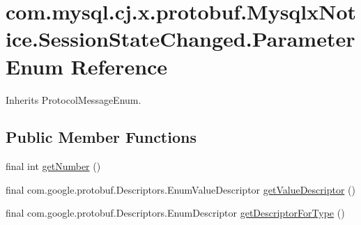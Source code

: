\hypertarget{enumcom_1_1mysql_1_1cj_1_1x_1_1protobuf_1_1_mysqlx_notice_1_1_session_state_changed_1_1_parameter}{}\section{com.\+mysql.\+cj.\+x.\+protobuf.\+Mysqlx\+Notice.\+Session\+State\+Changed.\+Parameter Enum Reference}
\label{enumcom_1_1mysql_1_1cj_1_1x_1_1protobuf_1_1_mysqlx_notice_1_1_session_state_changed_1_1_parameter}


Inherits Protocol\+Message\+Enum.

\subsection*{Public Member Functions}
\begin{DoxyCompactItemize}
\item 
final int \mbox{\hyperlink{enumcom_1_1mysql_1_1cj_1_1x_1_1protobuf_1_1_mysqlx_notice_1_1_session_state_changed_1_1_parameter_ab410bac2c8fa55f1d894fc45624a0ab7}{get\+Number}} ()
\item 
final com.\+google.\+protobuf.\+Descriptors.\+Enum\+Value\+Descriptor \mbox{\hyperlink{enumcom_1_1mysql_1_1cj_1_1x_1_1protobuf_1_1_mysqlx_notice_1_1_session_state_changed_1_1_parameter_a886925176f066724d13ef6a7a266818d}{get\+Value\+Descriptor}} ()
\item 
final com.\+google.\+protobuf.\+Descriptors.\+Enum\+Descriptor \mbox{\hyperlink{enumcom_1_1mysql_1_1cj_1_1x_1_1protobuf_1_1_mysqlx_notice_1_1_session_state_changed_1_1_parameter_ad6bf0d91ff6f6fe843a5c9a5bdb72319}{get\+Descriptor\+For\+Type}} ()
\end{DoxyCompactItemize}
